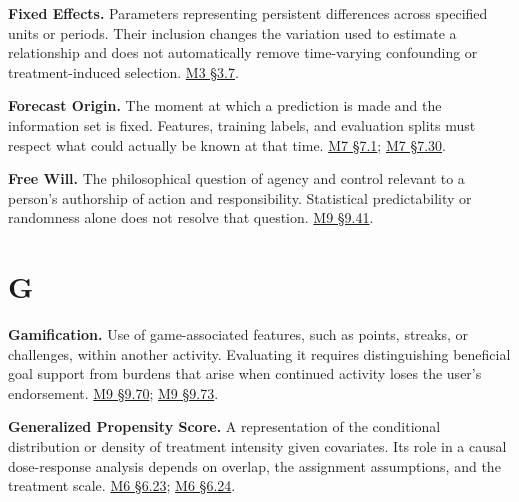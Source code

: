 \noindent\textbf{Fixed Effects.} Parameters representing persistent differences
across specified units or periods. Their inclusion changes the variation
used to estimate a relationship and does not automatically remove
time-varying confounding or treatment-induced selection.
\href{Marketing_Analytics_Lecture_Notes.pdf\#M03-diagnostics-and-panel-data}{M3
§3.7}.

\noindent\textbf{Forecast Origin.} The moment at which a prediction is made and
the information set is fixed. Features, training labels, and evaluation
splits must respect what could actually be known at that time.
\href{Marketing_Analytics_Lecture_Notes.pdf\#M07-specify-the-forecast-origin-and-target}{M7
§7.1};
\href{Marketing_Analytics_Lecture_Notes.pdf\#M07-event-timing-and-information-at-the-alert}{M7
§7.30}.

\noindent\textbf{Free Will.} The philosophical question of agency and control
relevant to a person's authorship of action and responsibility.
Statistical predictability or randomness alone does not resolve that
question.
\hyperref[M09-phenomena-noumena-and-the-ends-of-analysis]{M9
§9.41}.

\par{}
\hypertarget{module-g}{%
\section*{G}\label{module-g}}

\noindent\textbf{Gamification.} Use of game-associated features, such as points,
streaks, or challenges, within another activity. Evaluating it requires
distinguishing beneficial goal support from burdens that arise when
continued activity loses the user's endorsement.
\hyperref[M09-marketing-research-and-compulsive-online-engagement]{M9
§9.70};
\hyperref[M09-whose-value-does-gamification-create]{M9
§9.73}.

\noindent\textbf{Generalized Propensity Score.} A representation of the
conditional distribution or density of treatment intensity given
covariates. Its role in a causal dose-response analysis depends on
overlap, the assignment assumptions, and the treatment scale.
\href{Marketing_Analytics_Lecture_Notes.pdf\#M06-adjustment-for-selected-discount-intensity}{M6
§6.23};
\href{Marketing_Analytics_Lecture_Notes.pdf\#M06-overlap-weight-concentration-and-missing-confounders}{M6
§6.24}.


